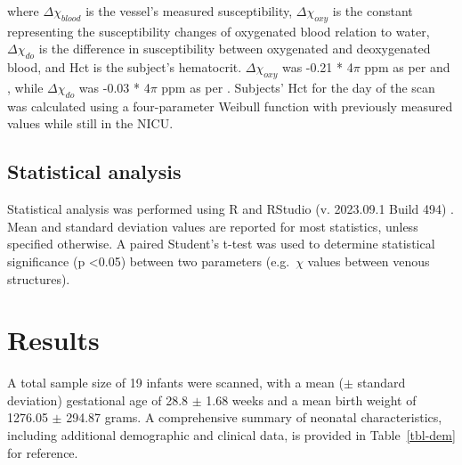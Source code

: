 \documentclass[
true
]{sn-jnl}
\begin{document}
where \(\Delta \chi _{blood}\) is the vessel's measured susceptibility,
\(\Delta \chi _{oxy}\) is the constant representing the susceptibility
changes of oxygenated blood relation to water, \(\Delta \chi _{do}\) is
the difference in susceptibility between oxygenated and deoxygenated
blood, and Hct is the subject's hematocrit. \(\Delta \chi _{oxy}\) was
-0.21 * 4\(\pi\) ppm as per \citet{portnoyHumanUmbilicalCord2018} and
\citep{sedlacikObtainingBloodOxygenation2007}, while
\(\Delta \chi _{do}\) was -0.03 * 4\(\pi\) ppm as per
\citep{weisskoffMRISusceptometryImagebased1992}. Subjects' Hct for the
day of the scan was calculated using a four-parameter Weibull function
with previously measured values while still in the NICU.

\subsection{Statistical analysis}\label{statistical-analysis}

Statistical analysis was performed using R and RStudio (v. 2023.09.1
Build 494)
\citep{rcoreteamLanguageEnvironmentStatistical2022, rstudioteamRStudioIntegratedDevelopment}.
Mean and standard deviation values are reported for most statistics,
unless specified otherwise. A paired Student's t-test was used to
determine statistical significance (p \textless0.05) between two
parameters (e.g.~\(\chi\) values between venous structures).

\section{Results}\label{sec-results}

A total sample size of 19 infants were scanned, with a mean (\(\pm\)
standard deviation) gestational age of 28.8 \(\pm\) 1.68 weeks and a
mean birth weight of 1276.05 \(\pm\) 294.87 grams. A comprehensive
summary of neonatal characteristics, including additional demographic
and clinical data, is provided in Table~\ref{tbl-dem} for reference.

\begingroup\fontsize{9}{11}\selectfont
\end{document}
